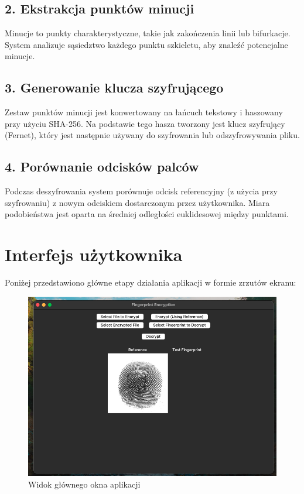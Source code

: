 \documentclass{urdpl}     %
\begin{document}
\subsection{2. Ekstrakcja punktów minucji}
Minucje to punkty charakterystyczne, takie jak zakończenia linii lub bifurkacje. System analizuje sąsiedztwo każdego punktu szkieletu, aby znaleźć potencjalne minucje.

\subsection{3. Generowanie klucza szyfrującego}
Zestaw punktów minucji jest konwertowany na łańcuch tekstowy i haszowany przy użyciu SHA-256. Na podstawie tego hasza tworzony jest klucz szyfrujący (Fernet), który jest następnie używany do szyfrowania lub odszyfrowywania pliku.

\subsection{4. Porównanie odcisków palców}
Podczas deszyfrowania system porównuje odcisk referencyjny (z użycia przy szyfrowaniu) z nowym odciskiem dostarczonym przez użytkownika. Miara podobieństwa jest oparta na średniej odległości euklidesowej między punktami.

\section{Interfejs użytkownika}

Poniżej przedstawiono główne etapy działania aplikacji w formie zrzutów ekranu:

\begin{figure}[H]
	\centering
	\includegraphics[width=\linewidth]{docs/app.png}
	\caption*{Widok głównego okna aplikacji}
\end{figure}
\end{document}
